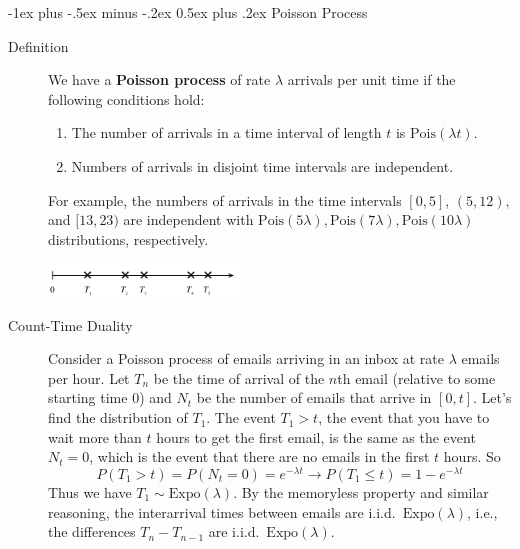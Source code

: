 \documentclass[6pt, landscape]{article}
\makeatletter
\renewcommand{\section}{\@startsection{section}{1}{0mm}%
                                {-1ex plus -.5ex minus -.2ex}%
                                {0.5ex plus .2ex}%
                                {\normalfont\bfseries}}
\newcommand{\Expo}{\textrm{Expo}}
\newcommand{\Pois}{\textrm{Pois}}
\makeatother
\begin{document}
\begin{multicols}{3}
        \section{Poisson Process}

        \begin{description}
                \item[Definition] We have a \textbf{Poisson process} of rate $\lambda$ arrivals per unit time if the following conditions hold:
                      \begin{enumerate}
                              \item The number of arrivals in a time interval of length $t$ is $\Pois(\lambda t)$.
                              \item Numbers of arrivals in disjoint time intervals are independent.
                      \end{enumerate}
                      For example, the numbers of arrivals in the time intervals $[0,5]$, $(5,12),$ and $[13,23)$ are independent with $\Pois(5\lambda), \Pois(7\lambda), \Pois(10\lambda)$ distributions, respectively.
                      \begin{minipage}{\linewidth}
                              \centering
                              \includegraphics[width=2in]{figures/pp.pdf}
                      \end{minipage}

                \item[Count-Time Duality]  Consider a Poisson process of emails arriving in an inbox at rate $\lambda$ emails per hour. Let $T_n$ be the time of arrival of the $n$th email (relative to some starting time $0$) and $N_t$ be the number of emails that arrive in $[0,t]$. Let's find the distribution of $T_1$. The event $T_1 > t$, the event that you have to wait more than $t$ hours to get the first email, is the same as the event $N_t = 0$, which is the event that there are no emails in the first $t$ hours. So
                      \[P(T_1 > t) = P(N_t = 0) = e^{-\lambda t} \longrightarrow P(T_1 \leq t) = 1 - e^{-\lambda t}\]
                      Thus we have $T_1 \sim \Expo(\lambda)$. By the memoryless property and similar reasoning, the interarrival times between emails are i.i.d.~$\Expo(\lambda)$, i.e., the differences $T_n - T_{n-1}$ are i.i.d.~$\Expo(\lambda)$.
        \end{description}


\end{multicols}
\end{document}
